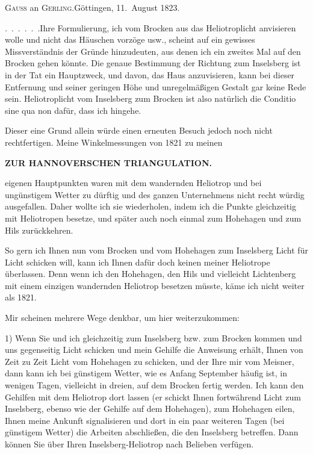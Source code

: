 \begingroup
\newcommand{\GerlingSeconds}[2]{#1\makebox[.42em][c]{,\makebox[0pt][r]{\textsuperscript{s}}}#2}
\begin{center}
\textsc{Gauss} an \textsc{Gerling}.\quad Göttingen, 11.~August 1823.
\end{center}

\par\noindent\hspace*{\parindent}\mbox{.\ .\ .\ .\ .\ .\quad Ihre} Formulierung,  ich vom Brocken aus das Heliotroplicht anvisieren wolle und nicht das Häuschen vorzöge usw., scheint auf ein gewisses Missverständnis der Gründe hinzudeuten, aus denen ich ein zweites Mal auf den Brocken gehen könnte.
Die genaue Bestimmung der Richtung zum Inselsberg ist in der Tat ein Hauptzweck, und davon, das Haus anzuvisieren, kann bei dieser Entfernung und seiner geringen Höhe und unregelmäßigen Gestalt gar keine Rede sein.
Heliotroplicht vom Inselsberg zum Brocken ist also natürlich die Conditio sine qua non dafür, dass ich hingehe.
\par\noindent\hspace*{\parindent}Dieser eine Grund allein würde einen erneuten Besuch jedoch noch nicht rechtfertigen.
Meine Winkelmessungen von 1821 zu meinen
\par\clearpage
\noindent\null\hfill{\small\textbf{ZUR HANNOVERSCHEN TRIANGULATION.}}\hfill{}\par\medskip
\noindent eigenen Hauptpunkten waren mit dem wandernden Heliotrop und bei ungünstigem Wetter zu dürftig und des ganzen Unternehmens nicht recht würdig ausgefallen. Daher wollte ich sie wiederholen, indem ich die Punkte gleichzeitig mit Heliotropen besetze, und später auch noch einmal zum Hohehagen und zum Hils zurückkehren.
\par\noindent\hspace*{\parindent}So gern ich Ihnen nun vom Brocken und vom Hohehagen zum Inselsberg Licht für Licht schicken will, kann ich Ihnen dafür doch keinen meiner Heliotrope überlassen. Denn wenn ich den Hohehagen, den Hils und vielleicht Lichtenberg mit einem einzigen wandernden Heliotrop besetzen müsste, käme ich nicht weiter als 1821.
\par\noindent\hspace*{\parindent}Mir scheinen mehrere Wege denkbar, um hier weiterzukommen:
\par\noindent\hspace*{\parindent}1) Wenn Sie und ich gleichzeitig zum Inselsberg bzw. zum Brocken kommen und uns gegenseitig Licht schicken und mein Gehilfe die Anweisung erhält, Ihnen von Zeit zu Zeit Licht vom Hohehagen zu schicken, und der Ihre mir vom Meisner, dann kann ich bei günstigem Wetter, wie es Anfang September häufig ist, in wenigen Tagen, vielleicht in dreien, auf dem Brocken fertig werden. Ich kann den Gehilfen mit dem Heliotrop dort lassen (er schickt Ihnen fortwährend Licht zum Inselsberg, ebenso wie der Gehilfe auf dem Hohehagen), zum Hohehagen eilen, Ihnen meine Ankunft signalisieren und dort in ein paar weiteren Tagen (bei günstigem Wetter) die Arbeiten abschließen, die den Inselsberg betreffen. Dann können Sie über Ihren Inselsberg-Heliotrop nach Belieben verfügen.

